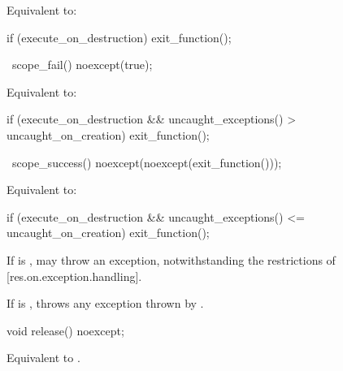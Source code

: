 \documentclass[ebook,11pt,article]{memoir}
\begin{document}
\begin{itemdescr}
\pnum
\effects 
Equivalent to:
\begin{codeblock}
if (execute_on_destruction)
	exit_function();
\end{codeblock}
\end{itemdescr}

\begin{itemdecl}
~scope_fail() noexcept(true);
\end{itemdecl}

\begin{itemdescr}
\pnum
\effects 
Equivalent to:
\begin{codeblock}
if (execute_on_destruction
   && uncaught_exceptions() > uncaught_on_creation)
	exit_function();
\end{codeblock}
\end{itemdescr}

\begin{itemdecl}
~scope_success() noexcept(noexcept(exit_function()));
\end{itemdecl}

\begin{itemdescr}
\pnum
\effects
Equivalent to:
\begin{codeblock}
if (execute_on_destruction 
   && uncaught_exceptions() <= uncaught_on_creation)
	exit_function();   
\end{codeblock}

\pnum
\begin{note}
If  is ,  may throw an exception, notwithstanding the restrictions of [res.on.exception.handling].
\end{note}

\pnum
\throws
If  is , throws any exception thrown by .

\end{itemdescr}

\begin{itemdecl}
void release() noexcept;
\end{itemdecl}

\begin{itemdescr}
\pnum
\effects
Equivalent to
.
\end{itemdescr}
\end{document}
